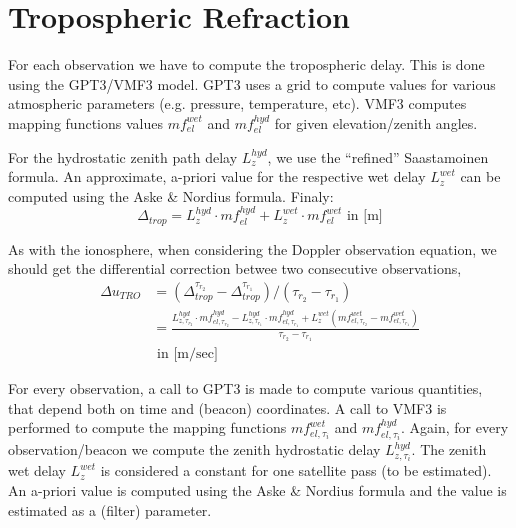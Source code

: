 \section{Tropospheric Refraction}
\label{sec:tropospheric-refraction}
For each observation we have to compute the tropospheric delay. This is done 
using the GPT3/VMF3 model. GPT3 uses a grid to compute values for various 
atmospheric parameters (e.g. pressure, temperature, etc). VMF3 computes mapping 
functions values $mf_{el}^{wet}$ and $mf_{el}^{hyd}$ for given elevation/zenith 
angles.

For the hydrostatic zenith path delay $L_{z}^{hyd}$, we use the 
``refined'' Saastamoinen formula. An approximate, a-priori value for the 
respective wet delay $L_{z}^{wet}$ can be computed using the Aske \& Nordius 
formula. Finaly:
\begin{equation}
  \Delta _{trop} = L_{z}^{hyd} \cdot mf_{el}^{hyd} 
                 + L_{z}^{wet} \cdot mf_{el}^{wet} \text{ in [m]}
\end{equation}

As with the ionosphere, when considering the Doppler observation equation, we 
should get the differential correction betwee two consecutive observations,
\begin{equation}
  \begin{split}
  \label{eq:dutropo}
  \Delta u_{TRO} & = \left( \Delta _{trop}^{\tau_{r_2}} 
                  - \Delta _{trop}^{\tau_{r_1}} \right)
                    / (\tau_{r_2} - \tau_{r_1}) \\
                 & = \frac{L_{z,\tau_{r_2}}^{hyd} \cdot mf_{el,\tau_{r_2}}^{hyd} 
                   - L_{z,\tau_{r_1}}^{hyd} \cdot mf_{el,\tau_{r_1}}^{hyd} 
                   + L_{z}^{wet} \left( mf_{el,\tau_{r_2}}^{wet} - mf_{el,\tau_{r_1}}^{wet} \right)}
                   {\tau_{r_2} - \tau_{r_1}} \\
                 & \text{ in [m/sec]}
  \end{split}
\end{equation}

For every observation, a call to GPT3 is made to compute various quantities, 
that depend both on time and (beacon) coordinates. A call to VMF3 is performed 
to compute the mapping functions $mf_{el,\tau_i}^{wet}$ and $mf_{el,\tau_i}^{hyd}$.
Again, for every observation/beacon we compute the zenith hydrostatic delay 
$L_{z,\tau_i}^{hyd}$. The zenith wet delay $L_{z}^{wet}$ is considered a 
constant for one satellite pass (to be estimated). An a-priori value is 
computed using the Aske \& Nordius formula and the value is estimated as a 
(filter) parameter.

